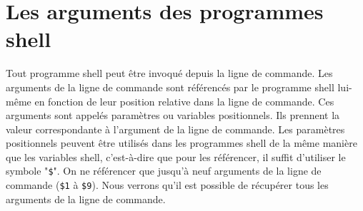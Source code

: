 %
%


\setcounter{remarque-cnt}{1}
\setcounter{example-cnt}{1}
\chapter{Les arguments des programmes shell}
\thispagestyle{fancy}

Tout programme shell peut {\^e}tre invoqu{\'e} depuis la ligne de
commande. Les arguments de la ligne de commande
sont r{\'e}f{\'e}renc{\'e}s par le programme shell lui-m{\^e}me en
fonction de leur position relative dans la ligne de commande. Ces
arguments sont appel{\'e}s param{\`e}tres ou
variables positionnels. Ils prennent la
valeur correspondante {\`a} l'argument de la ligne de commande. Les
param{\`e}tres positionnels peuvent {\^e}tre utilis{\'e}s dans les
programmes shell de la m{\^e}me mani{\`e}re que les variables shell,
c'est-{\`a}-dire que pour les r{\'e}f{\'e}rencer, il suffit d'utiliser
le symbole "\verb=$=". On ne r{\'e}f{\'e}rencer que jusqu'{\`a} neuf
arguments de la ligne de commande (\verb=$1= {\`a} \verb=$9=). Nous
verrons qu'il est possible de r{\'e}cup{\'e}rer tous les arguments de la
ligne de commande.

